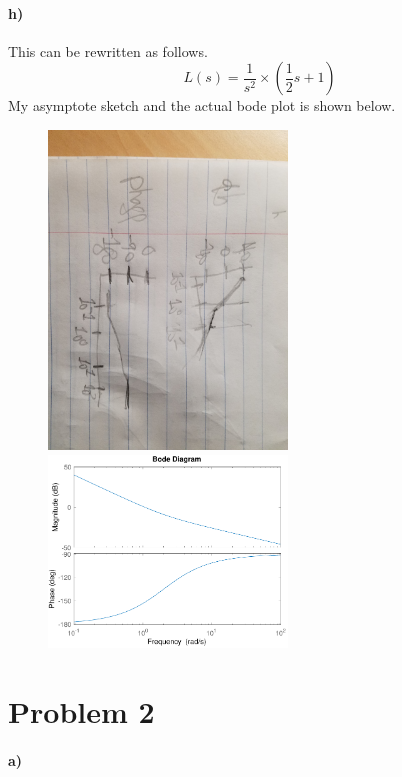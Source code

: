 \documentclass[12pt]{article}
\begin{document}
\paragraph{h)}
This can be rewritten as follows.
\[L(s)=\frac{1}{s^2}\times\left(\frac{1}{2}s+1\right)\]
My asymptote sketch and the actual bode plot is shown below.
\begin{figure}[H]
    \begin{center}
        \includegraphics[width=2.5in]{problem1h.jpg}
        \includegraphics[width=2.5in]{problem1h.pdf}
    \end{center}
\end{figure}

\section*{Problem 2}

\paragraph{a)}
\end{document}
